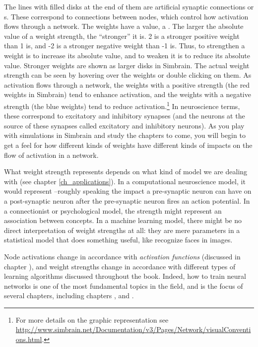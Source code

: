 
The lines with filled disks at the end of them are artificial synaptic connections or s. These correspond to connections between nodes, which control how activation flows through a network. The weights have a value, a . The larger the absolute value of a weight strength, the ``stronger'' it is.  2 is a stronger positive weight than 1 is, and -2 is a stronger negative weight than -1 is. Thus, to strengthen a weight is to increase its absolute value, and to weaken it is to reduce its absolute value.  Stronger weights are shown as larger disks in Simbrain. The actual weight strength can be seen by hovering over the weights or double clicking on them.  As activation flows through a network, the weights with a positive strength (the red weights in Simbrain) tend to enhance activation, and the weights with a negative strength (the blue weights) tend to reduce activation.\footnote{For more details on the graphic representation see \url{http://www.simbrain.net/Documentation/v3/Pages/Network/visualConventions.html}.} In neuroscience terms, these correspond to excitatory and inhibitory synapses (and the neurons at the source of these synapses called excitatory and inhibitory neurons). As you play with simulations in Simbrain and study the chapters to come, you will begin to get a feel for how different kinds of weights have different kinds of impacts on the flow of activation in a network. 

What weight strength represents depends on what kind of model we are dealing with (see chapter \ref{ch_applications}). In a computational neuroscience model, it would represent --roughly speaking the impact a pre-synaptic neuron can have on a post-synaptic neuron after the pre-synaptic neuron fires an action potential. In a connectionist or psychological model, the strength might represent an association between concepts. In a machine learning model, there might be no direct interpretation of weight strengths at all: they are mere parameters in a statistical model that does something useful, like recognize faces in images.

Node activations change in accordance with \emph{activation functions} (discussed in chapter ), and weight strengths change in accordance with different types of learning algorithms discussed throughout the book. Indeed, how to train neural networks is one of the most fundamental topics in the field, and is the focus of several chapters, including chapters ,  and . 

